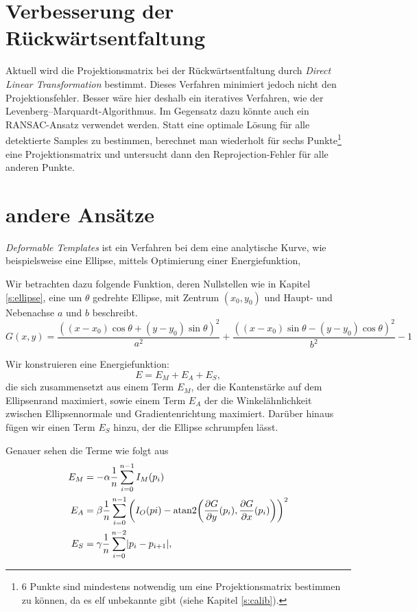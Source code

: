 \section{Verbesserung der Rückwärtsentfaltung}
Aktuell wird die Projektionsmatrix bei der Rückwärtsentfaltung durch \textit{Direct Linear Transformation} bestimmt. Dieses Verfahren minimiert jedoch nicht den Projektionsfehler. Besser wäre hier deshalb ein iteratives Verfahren, wie der Levenberg–Marquardt-Algorithmus. 
Im Gegensatz dazu könnte auch ein RANSAC-Ansatz verwendet werden. Statt eine optimale Lösung für alle detektierte Samples zu bestimmen, berechnet man wiederholt für sechs Punkte\footnote{6 Punkte sind mindestens notwendig um eine Projektionsmatrix bestimmen zu können, da es elf unbekannte gibt (siehe Kapitel \ref{s:calib}).} eine Projektionsmatrix und untersucht dann den Reprojection-Fehler für alle anderen Punkte. 



\section{andere Ansätze}
\textit{Deformable Templates} ist ein Verfahren bei dem eine analytische Kurve, wie beispielsweise eine Ellipse, mittels Optimierung einer Energiefunktion, 


Wir betrachten dazu folgende Funktion, deren Nullstellen wie in Kapitel \ref{s:ellipse}, eine um $\theta$ gedrehte Ellipse, mit Zentrum $(x_0,y_0)$ und Haupt- und Nebenachse $a$ und $b$ beschreibt. 
\begin{equation*}
	G(x,y) = \frac{((x - x_0)\cos\theta + (y - y_0)\sin\theta)^2}{a^2} + \frac{((x - x_0)\sin\theta - (y - y_0)\cos\theta)^2}{b^2} - 1
\end{equation*}

Wir konstruieren eine Energiefunktion:
\begin{equation*}
	E = E_M + E_A + E_S,
\end{equation*}
die sich zusammensetzt aus einem Term $E_M$, der die Kantenstärke auf dem Ellipsenrand maximiert, sowie einem Term $E_A$ der die Winkelähnlichkeit zwischen Ellipsennormale und Gradientenrichtung maximiert. Darüber hinaus fügen wir einen Term $E_S$ hinzu, der die Ellipse schrumpfen lässt. 

Genauer sehen die Terme wie folgt aus
\begin{equation*}
\begin{aligned}
E_M &= -\alpha\frac{1}{n}\sum_{i=0}^{n-1}I_M(p_i) \\
E_A &= \beta\frac{1}{n}\sum_{i=0}^{n-1}\left(I_O(pi) - \text{atan2}{\left(\frac{\partial G}{\partial y}(p_i), \frac{\partial G}{\partial x}(p_i)\right)}\right)^2 \\
E_S &= \gamma\frac{1}{n}\sum_{i=0}^{n-2}\lvert p_i - p_{i+1}\rvert,
\end{aligned}
\end{equation*}

